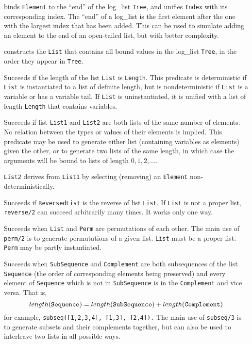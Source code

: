 \begin{description}
    binds {\tt Element} to the ``end'' of the log\_list {\tt Tree},
    and unifies {\tt Index} with its corresponding index.  The ``end''
    of a log\_list is the first element after the one with the largest
    index that has been added.  This can be used to simulate adding an
    element to the end of an open-tailed list, but with better
    complexity.

    constructs the {\tt List} that contains all bound values in the
    log\_list {\tt Tree}, in the order they appear in {\tt Tree}.
    


    Succeeds if the length of the list {\tt List} is {\tt Length}.
    This predicate is deterministic if {\tt List} is instantiated 
    to a list of definite length, but is nondeterministic if 
    {\tt List} is a variable or has a variable tail.  If {\tt List}
    is uninstantiated, it is unified with a list of length {\tt Length}
    that contains variables.

    Succeeds if list {\tt List1} and {\tt List2} are both lists of
    the same number of elements.  No relation between the types or
    values of their elements is implied.  This predicate may be used
    to generate either list (containing variables as elements) given
    the other, or to generate two lists of the same length, in which
    case the arguments will be bound to lists of length $0,1,2,\ldots$.

    {\tt List2} derives from {\tt List1} by selecting (removing) an 
    {\tt Element} non-deterministically.

    Succeeds if {\tt ReversedList} is the reverse of list {\tt List}.
    If {\tt List} is not a proper list, {\tt reverse/2} can succeed
    arbitrarily many times.  It works only one way.

    Succeeds when {\tt List} and {\tt Perm} are permutations of each
    other.  The main use of {\tt perm/2} is to generate permutations
    of a given list.  {\tt List} must be a proper list.
    {\tt Perm} may be partly instantiated.

    Succeeds when {\tt SubSequence} and {\tt Complement} are both
    subsequences of the list {\tt Sequence} (the order of corresponding
    elements being preserved) and every element of {\tt Sequence} which
    is not in {\tt SubSequence} is in the {\tt Complement} and vice
    versa.  That is,
    \[ length({\tt Sequence}) =
                length({\tt SubSequence})+length({\tt Complement}) \]
    for example, {\tt subseq([1,2,3,4], [1,3], [2,4]).}
    The main use of {\tt subseq/3} is to generate subsets and their
    complements together, but can also be used to interleave two lists
    in all possible ways.


\end{description}
